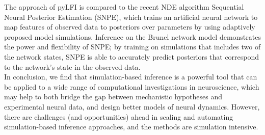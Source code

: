 The approach of pyLFI is compared to the recent NDE algorithm Sequential Neural Posterior Estimation (SNPE), which trains an artificial neural network to map features of observed data to posteriors over parameters by using adaptively proposed model simulations. Inference on the Brunel network model demonstrates the power and flexibility of SNPE; by training on simulations that includes two of the network states, SNPE is able to accurately predict posteriors that correspond to the network's state in the observed data.
\\
\indent In conclusion, we find that simulation-based inference is a powerful tool that can be applied to a wide range of computational investigations in neuroscience, which may help to both bridge the gap between mechanistic hypotheses and experimental neural data, and design better models of neural dynamics. However, there are challenges (and opportunities) ahead in scaling and automating simulation-based inference approaches, and the methods are simulation intensive. 
